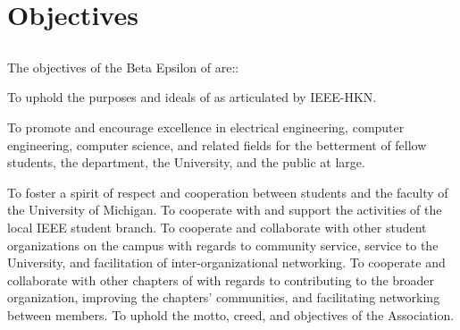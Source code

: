 \chapter{Objectives}\label{sec:objectives}
\section{}
The objectives of the Beta Epsilon of \hkn are::


\begin{enumsubsection}

\itemnotoc To uphold the purposes and ideals of \hkn as articulated by IEEE-HKN.

\itemnotoc To promote and encourage excellence in electrical engineering, computer engineering, computer science, and related fields for the betterment of fellow students, the department, the University, and the public at large.

\itemnotoc To foster a spirit of respect and cooperation between students and the faculty of the University of Michigan.
\itemnotoc To cooperate with and support the activities of the local IEEE student branch.
\itemnotoc To cooperate and collaborate with other student organizations on the campus with regards to community service, service to the University, and facilitation of inter-organizational networking.
\itemnotoc To cooperate and collaborate with other chapters of \hkn with regards to contributing to the broader organization, improving the chapters' communities, and facilitating networking between \hkn members.
\itemnotoc To uphold the motto, creed, and objectives of the Association.

\end{enumsubsection}

